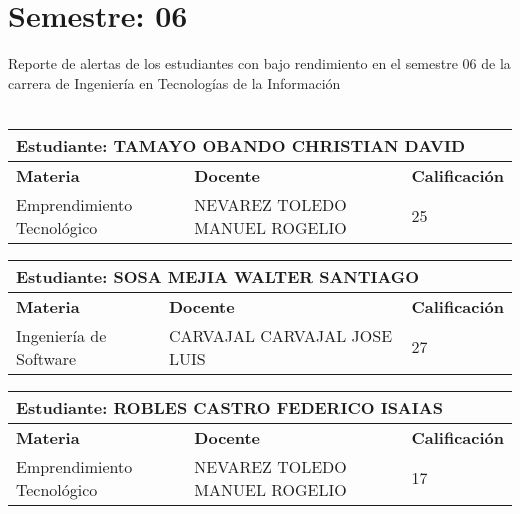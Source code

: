 \section{Semestre: 06}
        Reporte de alertas de los estudiantes con bajo rendimiento en el semestre 06 de la carrera de 
        Ingeniería en Tecnologías de la Información\\\\\small
\begin{tabularx}{\textwidth}{|p{5cm}|p{7cm}|X|}
\hline
\multicolumn{3}{|p{\dimexpr\textwidth-2\tabcolsep-2\arrayrulewidth}|}{\textbf{Estudiante: TAMAYO OBANDO CHRISTIAN DAVID }}\\\hline
\textbf{Materia} & \textbf{Docente} & \textbf{Calificación} \\ \hline
Emprendimiento Tecnológico & NEVAREZ TOLEDO MANUEL ROGELIO  & 25 \\ \hline
\end{tabularx}\vspace{10mm}
\small
\begin{tabularx}{\textwidth}{|p{5cm}|p{7cm}|X|}
\hline
\multicolumn{3}{|p{\dimexpr\textwidth-2\tabcolsep-2\arrayrulewidth}|}{\textbf{Estudiante: SOSA MEJIA WALTER SANTIAGO }}\\\hline
\textbf{Materia} & \textbf{Docente} & \textbf{Calificación} \\ \hline
Ingeniería de Software & CARVAJAL CARVAJAL JOSE LUIS  & 27 \\ \hline
\end{tabularx}\vspace{10mm}
\small
\begin{tabularx}{\textwidth}{|p{5cm}|p{7cm}|X|}
\hline
\multicolumn{3}{|p{\dimexpr\textwidth-2\tabcolsep-2\arrayrulewidth}|}{\textbf{Estudiante: ROBLES CASTRO FEDERICO ISAIAS }}\\\hline
\textbf{Materia} & \textbf{Docente} & \textbf{Calificación} \\ \hline
Emprendimiento Tecnológico & NEVAREZ TOLEDO MANUEL ROGELIO  & 17 \\ \hline
\end{tabularx}\vspace{10mm}

